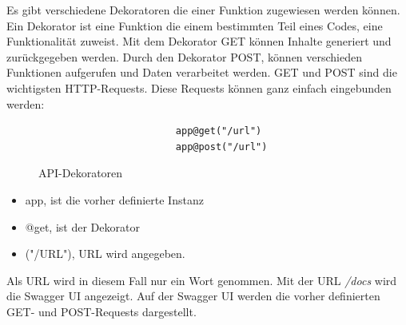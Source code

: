 Es gibt verschiedene Dekoratoren die einer Funktion zugewiesen werden können. Ein Dekorator ist eine Funktion die einem bestimmten Teil eines Codes, eine Funktionalität zuweist. Mit dem Dekorator GET können Inhalte generiert und zurückgegeben werden. Durch den Dekorator POST, können verschieden Funktionen aufgerufen und Daten verarbeitet werden. GET und POST\autocite{GETvsPOST} sind die wichtigsten HTTP-Requests. Diese Requests können ganz einfach eingebunden werden:
\vspace{3mm}
\begin{figure}[H]
    \centering
    \begin{verbatim}
                        app@get("/url")
                        app@post("/url")
    \end{verbatim}
    \caption{API-Dekoratoren}
\end{figure}
\begin{itemize}
    \item app, ist die vorher definierte Instanz
    \item @get, ist der Dekorator
    \item ("/URL"), URL wird angegeben.  
\end{itemize}

Als URL wird in diesem Fall nur ein Wort genommen. Mit der URL \textit{/docs} wird die Swagger UI\autocite{SwaggerUI} angezeigt. Auf der Swagger UI werden die vorher definierten GET- und POST-Requests dargestellt. \\

